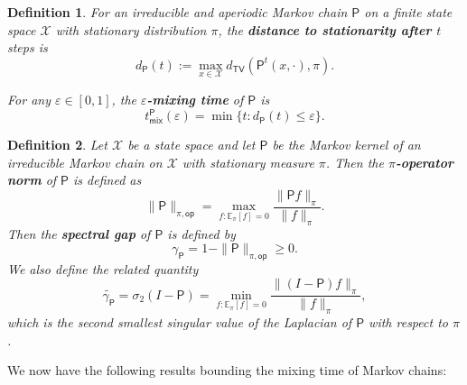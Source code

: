 \documentclass[11pt]{article}
\newtheorem{definition}{Definition}[section]
\begin{document}
\begin{definition}
    For an irreducible and aperiodic Markov chain $\mathsf{P}$ on a finite state space $\mathcal{X}$ with stationary distribution $\pi$, the \textbf{distance to stationarity after $t$} steps is
    \begin{equation*}
        d_{\mathsf{P}}(t):=\max_{x\in \mathcal{X}} d_{\mathsf{TV}}(\mathsf{P}^t(x,\cdot),\pi).
    \end{equation*}

    For any $\varepsilon\in [0,1]$, the \textbf{$\varepsilon$-mixing time} of $\mathsf{P}$ is
    \begin{equation*}
        t_{\mathsf{mix}}^{\mathsf{P}}(\varepsilon)=\min\{t: d_{\mathsf{P}}(t)\leq \varepsilon\}.
    \end{equation*}
\end{definition}

\begin{definition}
    Let $\mathcal{X}$ be a state space and let $\mathsf{P}$ be the Markov kernel of an irreducible Markov chain on $\mathcal{X}$ with stationary measure $\pi$. Then the \textbf{$\pi$-operator norm} of $\mathsf{P}$ is defined as 
    \begin{equation*}
        \|\mathsf{P}\|_{\pi,\mathsf{op}} = \max_{f:\mathbb{E}_{\pi}[f]=0} \frac{\|\mathsf{P}f\|_{\mathsf{\pi}}}{\|f\|_{\pi}}.
    \end{equation*}
    Then the \textbf{spectral gap} of $\mathsf{P}$ is defined by
    \begin{equation*}
        \gamma_{\mathsf{P}} = 1-\|\mathsf{P}\|_{\pi,\mathsf{op}}\geq 0.
    \end{equation*}
We also define the related quantity
    \begin{equation*}
\widetilde{\gamma_{\mathsf{P}}}=\sigma_2(I-\mathsf{P})=\min_{f:\mathbb{E}_{\pi}[f]=0} \frac{\|(I-\mathsf{P})f\|_{\pi}}{\|f\|_{\pi}},
    \end{equation*}
    which is the second smallest singular value of the Laplacian of $\mathsf{P}$ with respect to $\pi$.
\end{definition}

We now have the following results bounding the mixing time of Markov chains:
\end{document}
